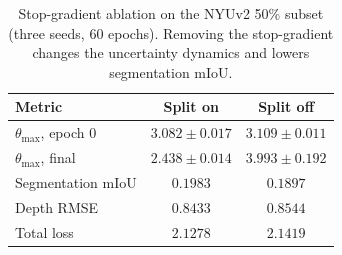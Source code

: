 \begin{table}[t]
\centering
\caption{Stop-gradient ablation on the NYUv2 50\% subset (three seeds, 60 epochs). Removing the stop-gradient changes the uncertainty dynamics and lowers segmentation mIoU.}
\label{tab:stop_gradient}
\small
\begin{tabular}{lcc}
\toprule
Metric & Split on & Split off \\
\midrule
$\theta_{\max}$, epoch 0 & $3.082 \pm 0.017$ & $3.109 \pm 0.011$ \\
$\theta_{\max}$, final & $2.438 \pm 0.014$ & $3.993 \pm 0.192$ \\
Segmentation mIoU & $0.1983$ & $0.1897$ \\
Depth RMSE & $0.8433$ & $0.8544$ \\
Total loss & $2.1278$ & $2.1419$ \\
\bottomrule
\end{tabular}
\end{table}
